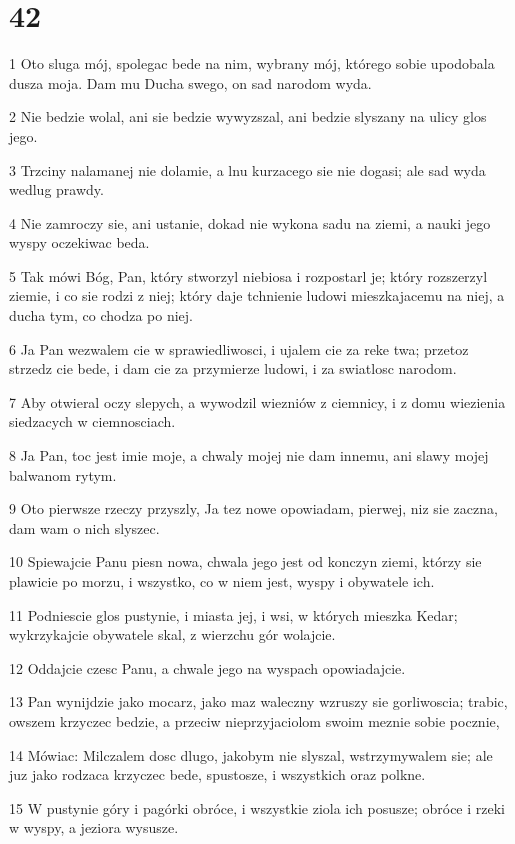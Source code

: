 \chapter{42}

\par 1 Oto sluga mój, spolegac bede na nim, wybrany mój, którego sobie upodobala dusza moja. Dam mu Ducha swego, on sad narodom wyda.
\par 2 Nie bedzie wolal, ani sie bedzie wywyzszal, ani bedzie slyszany na ulicy glos jego.
\par 3 Trzciny nalamanej nie dolamie, a lnu kurzacego sie nie dogasi; ale sad wyda wedlug prawdy.
\par 4 Nie zamroczy sie, ani ustanie, dokad nie wykona sadu na ziemi, a nauki jego wyspy oczekiwac beda.
\par 5 Tak mówi Bóg, Pan, który stworzyl niebiosa i rozpostarl je; który rozszerzyl ziemie, i co sie rodzi z niej; który daje tchnienie ludowi mieszkajacemu na niej, a ducha tym, co chodza po niej.
\par 6 Ja Pan wezwalem cie w sprawiedliwosci, i ujalem cie za reke twa; przetoz strzedz cie bede, i dam cie za przymierze ludowi, i za swiatlosc narodom.
\par 7 Aby otwieral oczy slepych, a wywodzil wiezniów z ciemnicy, i z domu wiezienia siedzacych w ciemnosciach.
\par 8 Ja Pan, toc jest imie moje, a chwaly mojej nie dam innemu, ani slawy mojej balwanom rytym.
\par 9 Oto pierwsze rzeczy przyszly, Ja tez nowe opowiadam, pierwej, niz sie zaczna, dam wam o nich slyszec.
\par 10 Spiewajcie Panu piesn nowa, chwala jego jest od konczyn ziemi, którzy sie plawicie po morzu, i wszystko, co w niem jest, wyspy i obywatele ich.
\par 11 Podniescie glos pustynie, i miasta jej, i wsi, w których mieszka Kedar; wykrzykajcie obywatele skal, z wierzchu gór wolajcie.
\par 12 Oddajcie czesc Panu, a chwale jego na wyspach opowiadajcie.
\par 13 Pan wynijdzie jako mocarz, jako maz waleczny wzruszy sie gorliwoscia; trabic, owszem krzyczec bedzie, a przeciw nieprzyjaciolom swoim meznie sobie pocznie,
\par 14 Mówiac: Milczalem dosc dlugo, jakobym nie slyszal, wstrzymywalem sie; ale juz jako rodzaca krzyczec bede, spustosze, i wszystkich oraz polkne.
\par 15 W pustynie góry i pagórki obróce, i wszystkie ziola ich posusze; obróce i rzeki w wyspy, a jeziora wysusze.
